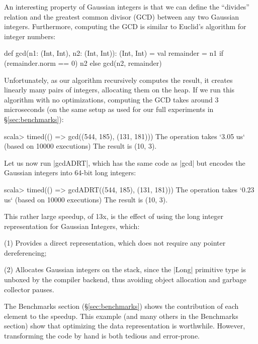 An interesting property of Gaussian integers is that we can define the
``divides'' relation and the greatest common divisor (GCD) between any
two Gaussian integers. Furthermore, computing the GCD is similar to
Euclid's algorithm for integer numbers:

\begin{lstlisting-nobreak}
def gcd(n1: (Int, Int), n2: (Int, Int)): (Int, Int) = {
  val remainder = n1 %
  if (remainder.norm == 0) n2 else gcd(n2, remainder)
}
\end{lstlisting-nobreak}

Unfortunately, as our algorithm recursively computes the result, it creates linearly many pairs of integers, allocating them on the heap. If we run this algorithm with no optimizations, computing the GCD takes around 3 microseconds (on the same setup as used for our full experiments in \S\ref{sec:benchmarks}):

\begin{lstlisting-nobreak}
scala> timed(() => gcd((544, 185), (131, 181)))
The operation takes `3.05 us` (based on 10000 executions)
The result is (10, 3).
\end{lstlisting-nobreak}

Let us now run |gcdADRT|, which has the same code as |gcd| but encodes the Gaussian integers into 64-bit long integers:

\begin{lstlisting-nobreak}
scala> timed(() => gcdADRT((544, 185), (131, 181)))
The operation takes `0.23 us` (based on 10000 executions)
The result is (10, 3).
\end{lstlisting-nobreak}

This rather large speedup, of 13x, is the effect of using the long integer representation for Gaussian Integers, which:

\vspace{0.25em}
\begin{compactitem}
  \item[(1)] Provides a direct representation, which does not require any pointer dereferencing;
  \item[(2)] Allocates Gaussian integers on the stack, since the |Long| primitive type is unboxed by the compiler backend, thus avoiding object allocation and garbage collector pauses.
\end{compactitem}
\vspace{0.25em}

The Benchmarks section (\S\ref{sec:benchmarks}) shows the contribution of each element to the speedup. This example (and many others in the Benchmarks section) show that optimizing the data representation is worthwhile. However, transforming the code by hand is both tedious and error-prone. %

